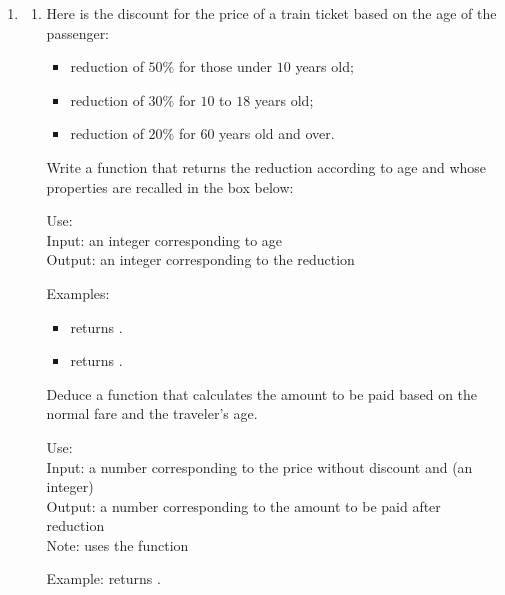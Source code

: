 \documentclass[11pt,class=report,crop=false]{standalone}
\begin{document}
\begin{activite}


\begin{enumerate}
  \item 
  
  \begin{enumerate}
  \item 
  Here is the discount for the price of a train ticket based on the age of the passenger:
  \begin{itemize}
    \item reduction of $50\%$ for those under $10$ years old;
    \item reduction of $30\%$ for $10$ to $18$ years old;
    \item reduction of $20\%$ for $60$ years old and over.
  \end{itemize}
  
  Write a function  that returns the reduction according to age and whose properties are recalled in the box below:
\begin{fonction}[\ci{reduction()}]
  Use:  \\
  Input: an integer corresponding to age \\
  Output: an integer corresponding to the reduction
  
  \medskip
    
  Examples: 
  \begin{itemize}
    \item {} returns .
    \item {} returns .
  \end{itemize}
  \end{fonction}  
  
  Deduce a  function that calculates the amount to be paid based on the normal fare and the traveler's age.
  
\begin{fonction}[\ci{amount()}]
  Use: \\
  Input: a number  corresponding to the price without discount and  (an integer)\\
  Output: a number corresponding to the amount to be paid after reduction\\
  Note: uses the function 
  \medskip
    
  Example:  returns .
  \end{fonction} 
  

\end{enumerate}
\end{enumerate}
\end{activite}
\end{document}
